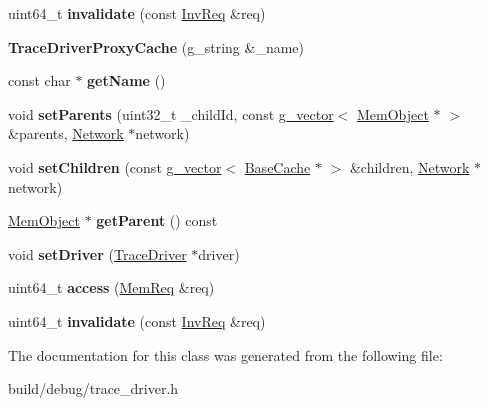 \begin{DoxyCompactItemize}
\item 
\hypertarget{classTraceDriverProxyCache_a0ec47f8660cc6fff1825476964377cf0}{uint64\-\_\-t {\bfseries invalidate} (const \hyperlink{structInvReq}{Inv\-Req} \&req)}\label{classTraceDriverProxyCache_a0ec47f8660cc6fff1825476964377cf0}

\item 
\hypertarget{classTraceDriverProxyCache_ad5ca59ffb64ba31ac887b8661866187c}{{\bfseries Trace\-Driver\-Proxy\-Cache} (g\-\_\-string \&\-\_\-name)}\label{classTraceDriverProxyCache_ad5ca59ffb64ba31ac887b8661866187c}

\item 
\hypertarget{classTraceDriverProxyCache_aa0f558fb9b39b117f6eb3d66c1998625}{const char $\ast$ {\bfseries get\-Name} ()}\label{classTraceDriverProxyCache_aa0f558fb9b39b117f6eb3d66c1998625}

\item 
\hypertarget{classTraceDriverProxyCache_a0259f6810fd340ea625bd89036cce845}{void {\bfseries set\-Parents} (uint32\-\_\-t \-\_\-child\-Id, const \hyperlink{classg__vector}{g\-\_\-vector}$<$ \hyperlink{classMemObject}{Mem\-Object} $\ast$ $>$ \&parents, \hyperlink{classNetwork}{Network} $\ast$network)}\label{classTraceDriverProxyCache_a0259f6810fd340ea625bd89036cce845}

\item 
\hypertarget{classTraceDriverProxyCache_a18eaadba894624e11bbd25412a2a4f43}{void {\bfseries set\-Children} (const \hyperlink{classg__vector}{g\-\_\-vector}$<$ \hyperlink{classBaseCache}{Base\-Cache} $\ast$ $>$ \&children, \hyperlink{classNetwork}{Network} $\ast$network)}\label{classTraceDriverProxyCache_a18eaadba894624e11bbd25412a2a4f43}

\item 
\hypertarget{classTraceDriverProxyCache_a7056ebc7197051c1283417e830cd36b4}{\hyperlink{classMemObject}{Mem\-Object} $\ast$ {\bfseries get\-Parent} () const }\label{classTraceDriverProxyCache_a7056ebc7197051c1283417e830cd36b4}

\item 
\hypertarget{classTraceDriverProxyCache_a1cbce92d89270aac1d26efafaac8b0f5}{void {\bfseries set\-Driver} (\hyperlink{classTraceDriver}{Trace\-Driver} $\ast$driver)}\label{classTraceDriverProxyCache_a1cbce92d89270aac1d26efafaac8b0f5}

\item 
\hypertarget{classTraceDriverProxyCache_af33428c4393b91b0c043440da629934a}{uint64\-\_\-t {\bfseries access} (\hyperlink{structMemReq}{Mem\-Req} \&req)}\label{classTraceDriverProxyCache_af33428c4393b91b0c043440da629934a}

\item 
\hypertarget{classTraceDriverProxyCache_a0ec47f8660cc6fff1825476964377cf0}{uint64\-\_\-t {\bfseries invalidate} (const \hyperlink{structInvReq}{Inv\-Req} \&req)}\label{classTraceDriverProxyCache_a0ec47f8660cc6fff1825476964377cf0}

\end{DoxyCompactItemize}


The documentation for this class was generated from the following file\-:\begin{DoxyCompactItemize}
\item 
build/debug/trace\-\_\-driver.\-h\end{DoxyCompactItemize}
